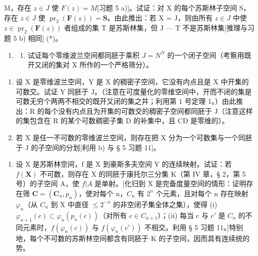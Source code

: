 M，存在 \(z \in J\) 使 \(F(z) = M\){[}习题 5 a){]}。试证：对 X 的每个苏斯林子空间 S，存在 \(z \in J\) 使 \(\operatorname{pr}_{2}(\mathbf{F}(z)) = \mathbf{S}\)。由此推出：若 X = J，则由所有 \(z \in J\) 中使 \(z \in \operatorname{pr}_{2}(\mathbf{F}(z))\) 者组成的集 T 是苏斯林集，但 J --- T 不是苏斯林集{[}推理与习题 5 b) 相同{]} (*)。

\begin{enumerate}
\def\labelenumi{\arabic{enumi})}
\setcounter{enumi}{6}
\tightlist
\item
  \begin{enumerate}
  \def\labelenumii{\alph{enumii})}
  \tightlist
  \item
    试证每个零维波兰空间都同胚于乘积 \(J = N^{N}\) 的一个闭子空间（考察用既开又闭的集对 X 所作的一个严格筛分）。
  \end{enumerate}
\end{enumerate}

\begin{enumerate}
\def\labelenumi{\alph{enumi})}
\setcounter{enumi}{1}
\item
  设 X 是零维波兰空间，Y 是 X 的稠密子空间，它没有内点且是 X 中开集的可数交。试证 Y 同胚于 J。（注意在可度量化的零维空间中，开而不闭的集是可数无穷个两两不相交的既开又闭的集之并；利用第 1 号定理 1。）由此推出：R 的每个没有内点且为开集的可数交的稠密子空间都同胚于 J（注意这样的集包含在 R 的某个可数稠密子集 D 的补集中，且 CD 是零维的）。
\item
  若 X 是任一不可数的零维波兰空间，则存在把 X 分为一个可数集与一个同胚于 J 的子空间的分划{[}利用 b) 与 § 5 习题 11{]}。
\end{enumerate}

\begin{enumerate}
\def\labelenumi{\arabic{enumi})}
\setcounter{enumi}{7}
\tightlist
\item
  设 X 是苏斯林空间，f 是 X 到豪斯多夫空间 Y 的连续映射。试证：若 \(f(\mathbf{X})\) 不可数，则存在 X 的同胚于康托尔三分集 K（第 IV 章，§ 2，第 5 号）的子空间 A，使 \(f|A\) 是单射。{[}化归到 X 是完备度量空间的情形：证明存在筛 \(\mathbf{C} = (\mathbf{C}_{n}, p_{n})\)，使对每个 n，\(C_{n}\) 有 \(2^{n}\) 个元素，且对每个 n 存在映射 \(\varphi_{n}\)（从 \(C_{n}\) 到 X 中直径 \(\leqslant 2^{-n}\) 的非空闭子集全体之集），使得 (i) \(\varphi_{n+1}(c) \subset \varphi_{n}(p_{n}(c))\)（对所有 \(c \in C_{n+1}\)）；(ii) 每当 c 与 \(c'\) 是 \(C_{n}\) 的不同元素时，\(f(\varphi_{n}(c))\) 与 \(f(\varphi_{n}(c'))\) 不相交。利用 § 5 习题 11。{]}特别地，每个不可数的苏斯林空间都含有同胚于 K 的子空间，因而具有连续统的势。
\end{enumerate}

